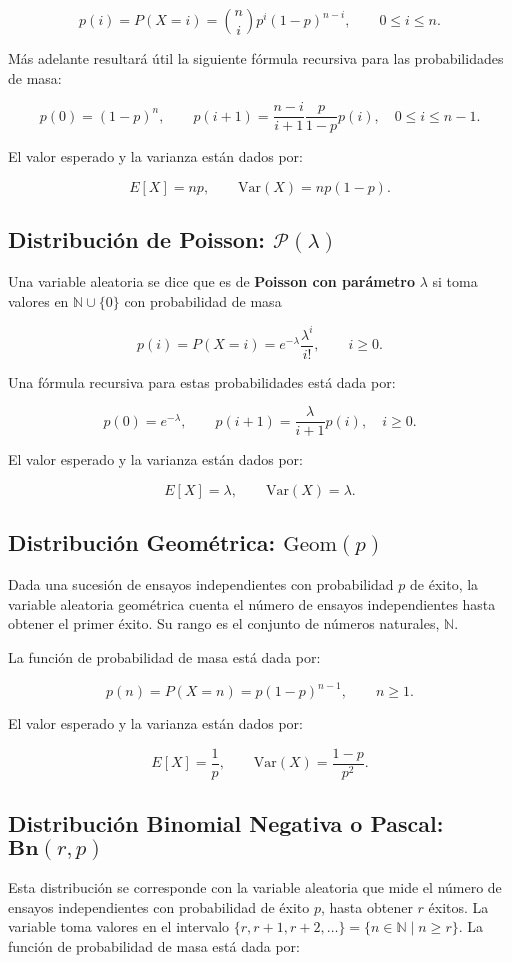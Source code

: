 \documentclass[11pt, a4paper]{article}
\theoremstyle{definition}
\begin{document}
\[p(i)=P(X=i)=\binom{n}{i}p^{i}(1-p)^{n-i},\qquad 0\leq i\leq n.\]

Más adelante resultará útil la siguiente fórmula recursiva para las probabilidades de masa:

\[p(0)=(1-p)^{n},\qquad p(i+1)=\frac{n-i}{i+1}\frac{p}{1-p}p(i),\quad 0\leq i \leq n-1.\]

El valor esperado y la varianza están dados por:

\[E[X]=np,\qquad \text{Var}(X)=np(1-p).\]

\subsection*{Distribución de Poisson: $\mathcal{P}(\lambda)$}
Una variable aleatoria se dice que es de \textbf{Poisson con parámetro} $\lambda$ si toma valores en $\mathbb{N}\cup \{0\}$ con probabilidad de masa

\[p(i)=P(X=i)=e^{-\lambda}\frac{\lambda^{i}}{i!},\qquad i\geq 0.\]

Una fórmula recursiva para estas probabilidades está dada por:

\[p(0)=e^{-\lambda},\qquad p(i+1)=\frac{\lambda}{i+1}p(i),\quad i\geq 0.\]

El valor esperado y la varianza están dados por:

\[E[X]=\lambda,\qquad \text{Var}(X)=\lambda.\]

\subsection*{Distribución Geométrica: $\text{Geom}(p)$}
Dada una sucesión de ensayos independientes con probabilidad $p$ de éxito, la variable aleatoria geométrica cuenta el número de ensayos independientes hasta obtener el primer éxito. Su rango es el conjunto de números naturales, $\mathbb{N}$.

La función de probabilidad de masa está dada por:

\[p(n)=P(X=n)=p(1-p)^{n-1},\qquad n\geq 1.\]

El valor esperado y la varianza están dados por:

\[E[X]=\frac{1}{p},\qquad \text{Var}(X)=\frac{1-p}{p^{2}}.\]

\subsection*{Distribución Binomial Negativa o Pascal: $\mathbf{Bn}(r,p)$}
Esta distribución se corresponde con la variable aleatoria que mide el número de ensayos independientes con probabilidad de éxito $p$, hasta obtener $r$ éxitos. La variable toma valores en el intervalo $\{r,r+1,r+2,\ldots\} = \{n\in\mathbb{N}\mid n\geq r\}$. La función de probabilidad de masa está dada por:
\end{document}
